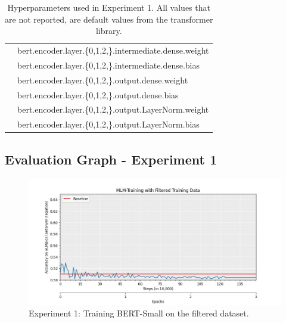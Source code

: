 \documentclass{article}
\begin{document}
\begin{table}[!h]
\begin{tabular}{r|l}
                      &      bert.encoder.layer.\{0,1,2,\}.intermediate.dense.weight \\
                      &      bert.encoder.layer.\{0,1,2,\}.intermediate.dense.bias \\
                      &      bert.encoder.layer.\{0,1,2,\}.output.dense.weight \\
                      &      bert.encoder.layer.\{0,1,2,\}.output.dense.bias \\
                      &      bert.encoder.layer.\{0,1,2,\}.output.LayerNorm.weight \\
                      &      bert.encoder.layer.\{0,1,2,\}.output.LayerNorm.bias \\
    \end{tabular}
    \caption{Hyperparameters used in Experiment 1. All values that are not reported, are default values from the transformer library.}
    \label{tab:hyp_exp1}
\end{table}
\newpage

\subsection{Evaluation Graph - Experiment 1}
\begin{figure}[!h]
    \centering
    \includegraphics[width=\textwidth]{figures/MLM_Training_with_Filtered_Training_Data.jpg}
    \caption{Experiment 1: Training BERT-Small on the filtered dataset.}
    \label{fig:graph_exp1}
\end{figure}
\end{document}
